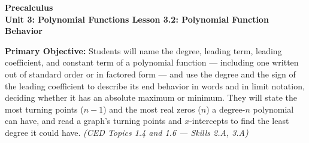 \documentclass[10pt]{article}
\newcommand{\CourseName}{Precalculus}
\newcommand{\UnitNumberName}{Unit 3: Polynomial Functions \quad}
\newcommand{\LessonNumberName}{Lesson 3.2: Polynomial Function Behavior}
\begin{document}
\begin{center}
    {\Large\bfseries \CourseName \\
    {\small\bfseries \UnitNumberName \LessonNumberName}}
\end{center}

\begin{tcolorbox}[colback=lilac, colframe=plum, boxrule=0.9pt, arc=2mm,
    left=2mm, right=2mm, top=1.5mm, bottom=1.5mm]
    \textbf{Primary Objective:} Students will name the degree, leading term, leading
    coefficient, and constant term of a polynomial function --- including one written out of
    standard order or in factored form --- and use the degree and the sign of the leading
    coefficient to describe its end behavior in words and in limit notation, deciding whether
    it has an absolute maximum or minimum. They will state the most turning points ($n - 1$)
    and the most real zeros ($n$) a degree-$n$ polynomial can have, and read a graph's turning
    points and $x$-intercepts to find the least degree it could have.
    \hfill\textit{\small (CED Topics 1.4 and 1.6 --- Skills 2.A, 3.A)}
\end{tcolorbox}
\end{document}
